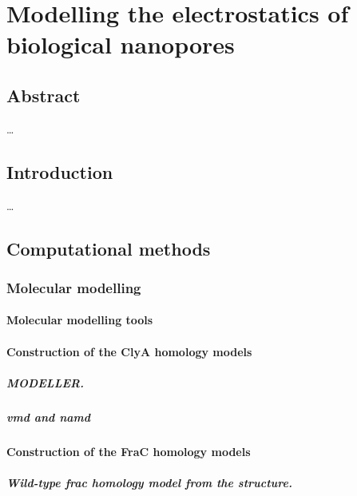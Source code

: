 \chapter{Modelling the electrostatics of biological nanopores}\label{ch:electrostatics}

\section{Abstract}
\ldots
\section{Introduction}
\ldots

\section{Computational methods}
%

\subsection{Molecular modelling}
%

\subsubsection{Molecular modelling tools}
%

\subsubsection{Construction of the ClyA homology models}


\paragraph{MODELLER.}

\paragraph{ \gls{vmd} and \gls{namd}}

\subsubsection{Construction of the FraC homology models}
%

\paragraph{Wild-type \gls{frac} homology model from the  structure.}

